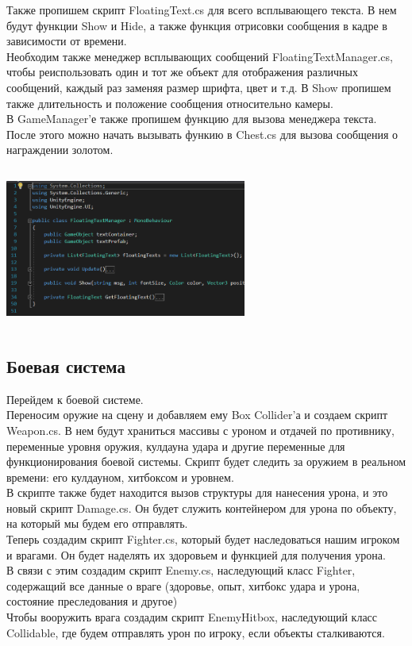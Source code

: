\documentclass[a4paper,12pt]{article}
\begin{document}
Также пропишем скрипт FloatingText.cs для всего всплывающего текста. В нем будут функции Show и Hide, а также функция отрисовки сообщения в кадре в зависимости от времени. \\
Необходим также менеджер всплывающих сообщений FloatingTextManager.cs, чтобы реиспользовать один и тот же объект для отображения различных сообщений, каждый раз заменяя размер шрифта, цвет и т.д. В Show пропишем также длительность и положение сообщения относительно камеры. \\
В GameManager'е также пропишем функцию для вызова менеджера текста.\\
После этого можно начать вызывать функию в Chest.cs для вызова сообщения о награждении золотом. \\
\centerline{\includegraphics[width = 300px, height=200px]{pictures/fm.png}}

\newpage
\subsection{Боевая система}
Перейдем к боевой системе.\\
Переносим оружие на сцену и добавляем ему Box Collider'а и создаем скрипт Weapon.cs. В нем будут храниться массивы с уроном и отдачей по противнику, переменные уровня оружия, кулдауна удара и другие переменные для функционирования боевой системы. Скрипт будет следить за оружием в реальном времени: его кулдауном, хитбоксом и уровнем. \\
В скрипте также будет находится вызов структуры для нанесения урона, и это новый скрипт Damage.cs. Он будет служить контейнером для урона по объекту, на который мы будем его отправлять. \\

Теперь создадим скрипт Fighter.cs, который будет наследоваться нашим игроком и врагами. Он будет наделять их здоровьем и функцией для получения урона. \\
В связи с этим создадим скрипт Enemy.cs, наследующий класс Fighter, содержащий все данные о враге (здоровье, опыт, хитбокс удара и урона, состояние преследования и другое) \\
Чтобы вооружить врага создадим скрипт EnemyHitbox, наследующий класс Collidable, где будем отправлять урон по игроку, если объекты сталкиваются.
\end{document}
